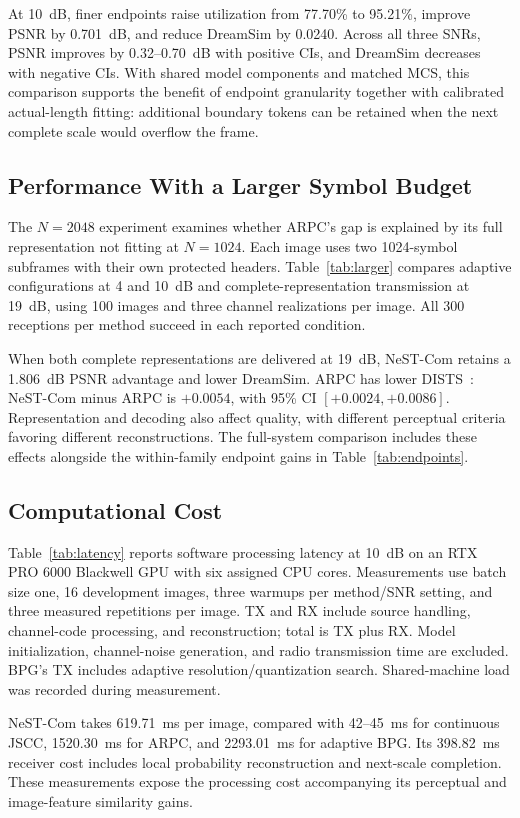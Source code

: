 At 10~dB, finer endpoints raise utilization from 77.70\% to 95.21\%, improve PSNR by 0.701~dB, and reduce DreamSim by 0.0240. Across all three SNRs, PSNR improves by 0.32--0.70~dB with positive CIs, and DreamSim decreases with negative CIs. With shared model components and matched MCS, this comparison supports the benefit of endpoint granularity together with calibrated actual-length fitting: additional boundary tokens can be retained when the next complete scale would overflow the frame.


\subsection{Performance With a Larger Symbol Budget}
The $N=2048$ experiment examines whether ARPC's gap is explained by its full representation not fitting at $N=1024$. Each image uses two 1024-symbol subframes with their own protected headers. Table~\ref{tab:larger} compares adaptive configurations at 4 and 10~dB and complete-representation transmission at 19~dB, using 100 images and three channel realizations per image. All 300 receptions per method succeed in each reported condition.

When both complete representations are delivered at 19~dB, NeST-Com retains a 1.806~dB PSNR advantage and lower DreamSim. ARPC has lower DISTS~\cite{dists}: NeST-Com minus ARPC is $+0.0054$, with 95\% CI $[+0.0024,+0.0086]$. Representation and decoding also affect quality, with different perceptual criteria favoring different reconstructions. The full-system comparison includes these effects alongside the within-family endpoint gains in Table~\ref{tab:endpoints}.


\subsection{Computational Cost}
Table~\ref{tab:latency} reports software processing latency at 10~dB on an RTX PRO 6000 Blackwell GPU with six assigned CPU cores. Measurements use batch size one, 16 development images, three warmups per method/SNR setting, and three measured repetitions per image. TX and RX include source handling, channel-code processing, and reconstruction; total is TX plus RX. Model initialization, channel-noise generation, and radio transmission time are excluded. BPG's TX includes adaptive resolution/quantization search. Shared-machine load was recorded during measurement.

NeST-Com takes 619.71~ms per image, compared with 42--45~ms for continuous JSCC, 1520.30~ms for ARPC, and 2293.01~ms for adaptive BPG. Its 398.82~ms receiver cost includes local probability reconstruction and next-scale completion. These measurements expose the processing cost accompanying its perceptual and image-feature similarity gains.

